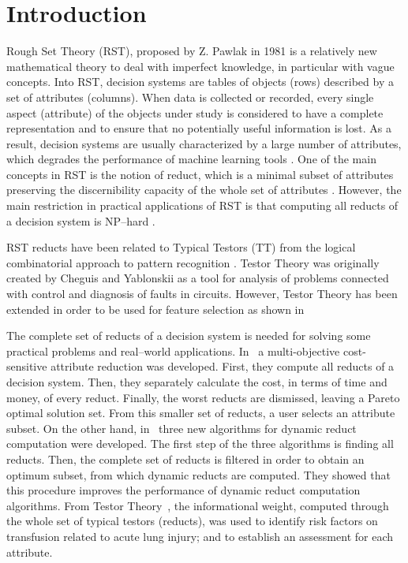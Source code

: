 \documentclass[letterpaper, twoside, openright, 12pt]{book}%
\begin{document}
\section{Introduction}
%
  Rough Set Theory (RST), proposed by Z. Pawlak in 1981 \citep{Pawlak81,Pawlak81-2,Pawlak82,Pawlak91} is a relatively new mathematical theory to deal with imperfect knowledge, in particular with vague concepts. Into RST, decision systems are tables of objects (rows) described by a set of attributes (columns). When data is collected or recorded, every single aspect (attribute) of the objects under study is considered to have a complete representation and to ensure that no potentially useful information is lost. As a result, decision systems are usually characterized by a large number of attributes, which degrades the performance of machine learning tools \citep{Parthalain08}. One of the main concepts in RST is the notion of reduct, which is a minimal subset of attributes preserving the discernibility capacity of the whole set of attributes \citep{Pawlak91}. However, the main restriction in practical applications of RST is that computing all reducts of a decision system is NP--hard \citep{Skowron92}. 
   
  RST reducts have been related to Typical Testors (TT) from the logical combinatorial approach to pattern recognition \citep{Chikalov2013}. Testor Theory was originally created by Cheguis and Yablonskii \cite{Cheguis55} as a tool for analysis of problems connected with control and diagnosis of faults in circuits.  However, Testor Theory has been extended in order to be used for feature selection as shown in \citep{Dmitriev1966,Martinez01,Ruiz08}

  The complete set of reducts of a decision system is needed for solving some practical problems and real--world applications. In~\cite{Xu2013} a multi-objective cost-sensitive attribute reduction was developed. First, they compute all reducts of a decision system. Then, they separately calculate the cost, in terms of time and money, of every reduct. Finally, the worst reducts are dismissed, leaving a Pareto optimal solution set. From this smaller set of reducts, a user selects an attribute subset. On the other hand, in~\cite{Mukamakuza2014} three new algorithms for dynamic reduct computation were developed. The first step of the three algorithms is finding all reducts. Then, the complete set of reducts is filtered in order to obtain an optimum subset, from which dynamic reducts are computed. They showed that this procedure improves the performance of dynamic reduct computation algorithms. From Testor Theory~\cite{Torres2014}, the informational weight, computed through the whole set of typical testors (reducts), was used to identify risk factors on transfusion related to acute lung injury; and to establish an assessment for each attribute.
  
\end{document}
